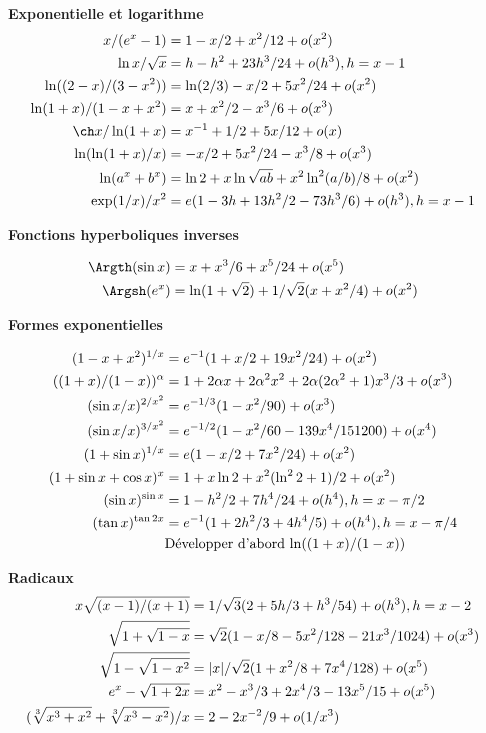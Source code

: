 {{\textbf{Exponentielle et logarithme}
%
\begin{align*}
x/(e^x-1)          &= 1 - x/2 + x^2/12  + o(x^2)                       \cr
\ln x/\sqrt x      &= h - h^2 + 23h^3/24   + o(h^3), h = x-1           \cr
\ln((2-x)/(3-x^2)) &= \ln(2/3) - x/2 + 5x^2/24  + o(x^2)               \cr
\ln(1+x)/(1-x+x^2) &= x + x^2/2 - x^3/6   + o(x^3)                     \cr
\ch x/\ln(1+x)     &= x^{-1} + 1/2 + 5x/12    + o(x)                 \cr
\ln(\ln(1+x)/x)    &= -x/2 + 5x^2/24 - x^3/8 + o(x^3)                  \cr
\ln(a^x+b^x)       &= \ln2 + x\ln\sqrt{ab} + x^2\ln^2(a/b)/8 + o(x^2)  \cr
\exp(1/x)/x^2      &= e(1 - 3h + 13h^2/2 - 73h^3/6)  + o(h^3), h = x-1         \cr
\end{align*}

\textbf{Fonctions hyperboliques inverses}
%

\begin{align*}
\Argth(\sin x)   &= x + x^3/6 + x^5/24  + o(x^5)                  \cr
\Argsh(e^x)      &= \ln(1+\sqrt2) + 1/\sqrt2(x + x^2/4)  + o(x^2) \cr
\end{align*}


\textbf{Formes exponentielles}
%

\begin{align*}
(1-x+x^2)^{1/x}       &= e^{-1}(1 + x/2 + 19x^2/24) + o(x^2)           \cr
((1+x)/(1-x))^\alpha  &= 1 + 2\alpha x + 2\alpha^2x^2 + 2\alpha(2\alpha^2+1)x^3/3 + o(x^3) \cr
(\sin x/x)^{2/x^2}    &= e^{-1/3}(1 - x^2/90) + o(x^3)                \cr
(\sin x/x)^{3/x^2}    &= e^{-1/2}(1 - x^2/60 - 139x^4/151200)+ o(x^4) \cr
(1+\sin x)^{1/x}      &= e(1 - x/2 + 7x^2/24)  + o(x^2)                \cr
(1+\sin x + \cos x)^x &= 1 + x\ln2 + x^2(\ln^22+1)/2  + o(x^2)         \cr
(\sin x)^{\sin x}     &= 1 - h^2/2 + 7h^4/24  + o(h^4), h = x-\pi/2                 \cr
(\tan x)^{\tan2x}     &= e^{-1}(1 + 2h^2/3 + 4h^4/5)   + o(h^4), h = x-\pi/4     \cr
                      &   \text{Développer d'abord $\ln((1+x)/(1-x))$}   \cr
\end{align*}

\textbf{Radicaux}
%
\begin{align*}
x\sqrt{(x-1)/(x+1)}   &= 1/\sqrt3(2 + 5h/3 + h^3/54)  + o(h^3), h = x-2              \cr
\sqrt{1+\sqrt{1-x}}   &= \sqrt2(1 - x/8 - 5x^2/128 - 21x^3/1024) + o(x^3)  \cr
\sqrt{1-\sqrt{1-x^2}} &= |x|/\sqrt2(1 + x^2/8 + 7x^4/128) + o(x^5)        \cr
e^x-\sqrt{1+2x}       &= x^2 - x^3/3 + 2x^4/3 - 13x^5/15  + o(x^5)        \cr
(\sqrt[3]{x^3+x^2}+\sqrt[3]{x^3-x^2})/x &= 2 - 2x^{-2}/9  + o(1/x^3)          \cr
\end{align*}
}
}
